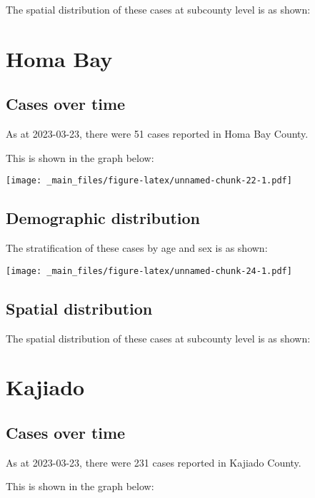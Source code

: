 \documentclass[
]{book}
\begin{document}
The spatial distribution of these cases at subcounty level is as shown:

\hypertarget{homa-bay}{%
\chapter{Homa Bay}\label{homa-bay}}

\hypertarget{cases-over-time-3}{%
\section{Cases over time}\label{cases-over-time-3}}

As at 2023-03-23, there were 51 cases reported in Homa Bay County.

This is shown in the graph below:

\texttt{[image: \_main\_files/figure-latex/unnamed-chunk-22-1.pdf]}

\hypertarget{demographic-distribution-3}{%
\section{Demographic distribution}\label{demographic-distribution-3}}

The stratification of these cases by age and sex is as shown:

\texttt{[image: \_main\_files/figure-latex/unnamed-chunk-24-1.pdf]}

\hypertarget{spatial-distribution-3}{%
\section{Spatial distribution}\label{spatial-distribution-3}}

The spatial distribution of these cases at subcounty level is as shown:

\hypertarget{kajiado}{%
\chapter{Kajiado}\label{kajiado}}

\hypertarget{cases-over-time-4}{%
\section{Cases over time}\label{cases-over-time-4}}

As at 2023-03-23, there were 231 cases reported in Kajiado County.

This is shown in the graph below:
\end{document}
